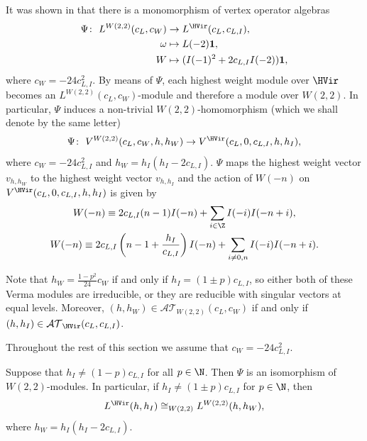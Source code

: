 It was shown in \cite{nas} that there is a monomorphism of vertex operator algebras
\begin{align}
\Psi \colon \ L^{W(2,2)}(c_{L},c_{W})& \rightarrow L^{\HVir}(c_{L},c_{L,I}),\label{Psi} \\
\omega & \mapsto L(-2)\mathbf{1}, \notag \\
W& \mapsto (I(-1)^{2}+2c_{L,I}I(-2))\mathbf{1}, \notag
\end{align}%
where $c_{W}=-24c_{L,I}^{2}$. By means of $\Psi $, each highest weight module over $\HVir$ becomes an \linebreak $L^{W(2,2)}(c_{L},c_{W})$-module and
therefore a module over $W(2,2) $. In particular, $\Psi $ induces a non-trivial $W(2,2)$-homomorphism (which we shall denote by the same letter)
\begin{gather*}
\Psi \colon \ V^{W(2,2)}(c_{L},c_{W},h,h_{W}) \rightarrow V^{\HVir} ( c_{L},0,c_{L,I},h,h_{I} ),
\end{gather*}
where $c_{W}=-24c_{L,I}^{2}$ and $h_{W}=h_{I}(h_{I}-2c_{L,I})$. $\Psi$ maps the highest weight vector $v_{h,h_{W}}$ to the highest weight vector
$v_{h,h_{I}}$ and the action of $W(-n)$ on $V^{\HVir} ( c_{L},0,c_{L,I},h,h_{I} )$ is given by
\begin{gather}
W(-n) \equiv 2c_{L,I}(n-1) I(-n)+\sum_{i\in \Z}I(-i)I(-n+i),\label{W u I} \\
W(-n) \equiv 2 c_{L,I}\left(n- 1 + \frac{h_I}{c_{L,I} } \right) I(- n)+\sum_{i\ne 0,n } I(-i)I(- n+i).\nonumber
\end{gather}

Note that $h_{W}=\frac{1-p^{2}}{24}c_{W}$ if and only if $h_{I}= ( 1\pm p) c_{L,I}$, so either both of these Verma modules are irreducible, or they are reducible with singular vectors at equal levels. Moreover, $ (h,h_W) \in {\mathcal {AT} }_{W(2,2)} ( c_L, c_W ) $ if and only if $(h,h_I) \in {\mathcal {AT} }_{\HVir} ( c_L, c_{L,I} )$.

Throughout the rest of this section we assume that $ c_W = -24c_{L,I}^2 $.

\begin{Lemma} \label{psi}Suppose that $h_{I}\neq(1-p) c_{L,I}$ for all $p\in \N$. Then $\Psi$ is an isomorphism of $W(2,2)$-modules. In particular, if $ h_I \neq (1\pm p) c_{L,I} $ for $p \in \N $, then
\begin{gather*}
L^{\HVir}(h,h_I)\cong_{W(2,2)}L^{W(2,2)}(h,h_W),
\end{gather*}
where $h_W = h_I (h_I-2c_{L,I}) $.
\end{Lemma}

